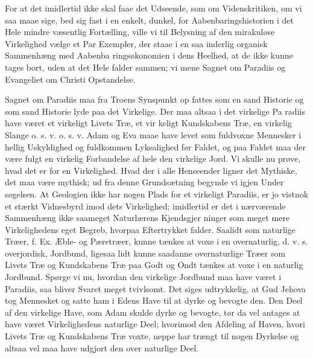 \documentclass[12pt]{book}
\newcommand{\opage}[1]{\marginnote{\footnotesize\textit{[#1]}}}
\begin{document}
For at det imidlertid ikke skal faae det Udseende,
som om Videnskritiken, om vi saa maae sige, bed sig fast
i en enkelt, dunkel, for Aabenbaringshistorien i det Hele
mindre væsentlig Fortælling, ville vi til Belysning af den
mirakuløse Virkelighed vælge et Par Exempler, der staae
i en saa inderlig organisk Sammenhæng med Aabenba\-%
ringsøkonomien i dens Heelhed, at de ikke kunne tages
bort, uden at det Hele falder sammen; vi mene Sagnet
om Paradiis og Evangeliet om Christi Opstandelse.

\opage{160}\setcounter{footnote}{0}%
Sagnet om Paradiis maa fra Troens Synspunkt op\-%
fattes som en sand Historie og som sand Historie lyde
paa det Virkelige. Der maa altsaa i det virkelige Pa\-%
radiis have været et virkeligt Livets Træ, et vir\-%
keligt Kundskabens Træ, en virkelig Slange o. s. v. o. s. v.
Adam og Eva maae have levet som fuldvoxne Mennesker
i hellig Uskyldighed og fuldkommen Lyksalighed før
Faldet, og paa Faldet maa der være fulgt en virkelig
Forbandelse af hele den virkelige Jord. Vi skulle nu
prøve, hvad det er for en Virkelighed. Hvad der i alle
Henseender ligner det Mythiske, det maa være mythisk;
ud fra denne Grundsætning begynde vi igjen Under\-%
søgelsen. At Geologien ikke har nogen Plads for et
virkeligt Paradiis, er jo vistnok et stærkt Vidnesbyrd
imod dets Virkelighed; imidlertid er det i nærværende
Sammenhæng ikke saameget Naturlærens Kjendsgjer\-%
ninger som meget mere Virkelighedens eget Begreb,
hvorpaa Eftertrykket falder. Saalidt som naturlige Træer,
f. Ex. Æble- og Pæretræer, kunne tænkes at voxe i en
overnaturlig, d. v. s. overjordisk, Jordbund, ligesaa lidt
kunne saadanne overnaturlige Træer som Livets Træ
og Kundskabens Træ paa Godt og Ondt tænkes at voxe
i en naturlig Jordbund. Spørge vi nu, hvordan den
virkelige Jordbund maa have været i Paradiis, saa bliver
Svaret meget tvivlsomt. Det siges udtrykkelig, at Gud
Jehova tog Mennesket og satte ham i Edens Have til
at dyrke og bevogte den. Den Deel af den virkelige
Have, som Adam skulde dyrke og bevogte, tør da vel
antages at have været Virkelighedens naturlige Deel;
hvorimod den Afdeling af Haven, hvori Livets Træ og
Kundskabens Træ voxte, neppe har trængt til nogen
Dyrkelse og altsaa vel maa have udgjort den over\-%
naturlige Deel.
\end{document}
